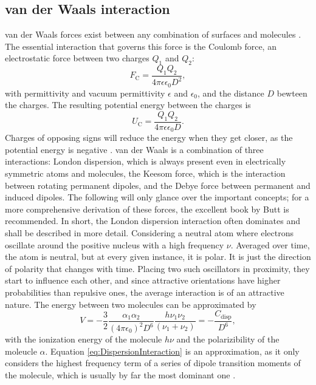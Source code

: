 \subsection{van der Waals interaction}
van der Waals forces exist between any combination of surfaces and molecules \cite{Butt2018}.
The essential interaction that governs this force is the Coulomb force, an electrostatic force between two charges $Q_1$ and $Q_2$:
\begin{equation}
    F_\mathrm{C} = \frac{Q_1Q_2}{4\pi \epsilon \epsilon_0 D^2},
\end{equation}
with permittivity and vacuum permittivity $\epsilon$ and $\epsilon_0$, and the distance $D$ bewteen the charges\cite{Butt2018}.
The resulting potential energy between the charges is
\begin{equation}
    U_\mathrm{C} = \frac{Q_1Q_2}{4\pi \epsilon \epsilon_0 D}.
\end{equation}
Charges of opposing signs will reduce the energy when they get closer, as the potential energy is negative \cite{Butt2018}.
van der Waals is a combination of three interactions: London dispersion, which is always present even in electrically symmetric atoms and molecules, the Keesom force, which is the interaction between rotating permanent dipoles, and the Debye force between permanent and induced dipoles.
The following will only glance over the important concepts; for a more comprehensive derivation of these forces, the excellent book by Butt\cite{Butt2018} is recommended. 
In short, the London dispersion interaction often dominates and shall be described in more detail.
Considering a neutral atom where electrons oscillate around the positive nucleus with a high frequency $\nu$\cite{Butt2018}.
Averaged over time, the atom is neutral, but at every given instance, it is polar. 
It is just the direction of polarity that changes with time.
Placing two such oscillators in proximity, they start to influence each other, and since attractive orientations have higher probabilities than repulsive ones, the average interaction is of an attractive nature.
The energy between two molecules can be approximated by
\begin{equation}\label{eq:DispersionInteraction}
    V = -\frac{3}{2} \frac{\alpha_1 \alpha_2}{(4\pi \epsilon_0)^2 D^6} \frac{h \nu_1 \nu_2 }{(\nu_1 + \nu_2)} = -\frac{C_\mathrm{disp}}{D^6},
\end{equation}
with the ionization energy of the molecule $h\nu$ and the polarizibility of the moleucle $\alpha$.
Equation \ref{eq:DispersionInteraction} is an approximation, as it only considers the highest frequency term of a series of dipole transition moments of the molecule, which is usually by far the most dominant one \cite{Butt2018}.

